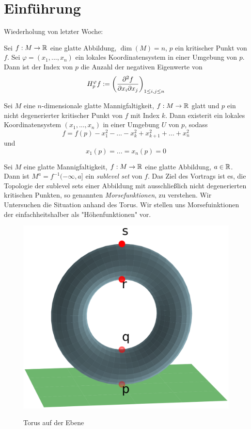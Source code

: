 \section{Einführung}

Wiederholung von letzter Woche:

\begin{definition}
    Sei $f: M \to \R$ eine glatte Abbildung, $\dim(M) = n$, $p$ ein kritischer 
    Punkt von $f$. Sei $\varphi = (x_1, ..., x_n)$ ein lokales Koordinatensystem 
    in einer Umgebung von $p$. Dann ist der Index von $p$ die Anzahl der 
    negativen Eigenwerte von
    \[ H_p^{\varphi}f := \left( \pdderive[f]{x_i}{x_j} \right)_{1 \leq i, j \leq n} \]
\end{definition}

\begin{theorem}
    Sei $M$ eine $n$-dimensionale glatte Mannigfaltigkeit, $f: M \to \R$ glatt 
    und $p$ ein nicht degenerierter kritischer Punkt von $f$ mit Index $k$. Dann 
    existerit ein lokales Koordinatensystem $(x_1, ..., x_n)$ in einer Umgebung
    $U$ von $p$, sodass
    \[ f = f(p) - x_1^2 - ... - x_k^2 + x_{k + 1}^2 + ... + x_n^2 \]
    und 
    \[ x_1(p) = ... = x_n (p) = 0 \]
\end{theorem}
\sectiondone

Sei $M$ eine glatte Mannigfaltigkeit, $f: M \to \R$ eine glatte Abbildung, 
$a \in \R$. Dann ist $M^a = f^{-1}(- \infty, a]$ ein \textit{sublevel set} von 
$f$. Das Ziel des Vortrags ist es, die Topologie der sublevel sets einer 
Abbildung mit ausschließlich nicht degenerierten kritischen Punkten, so genannten
\textit{Morsefunktionen}, zu verstehen.
Wir Untersuchen die Situation anhand des Torus. Wir stellen uns Morsefuinktionen
der einfachheitshalber als "Höhenfunktionen" vor.

\begin{figure}[H]
    \centering
    \includegraphics[width=0.6\linewidth]{resources/Me-Diagram1-torus-plane.png}
    \label{fig:me-diagram1}
    \caption{Torus auf der Ebene}
\end{figure}

